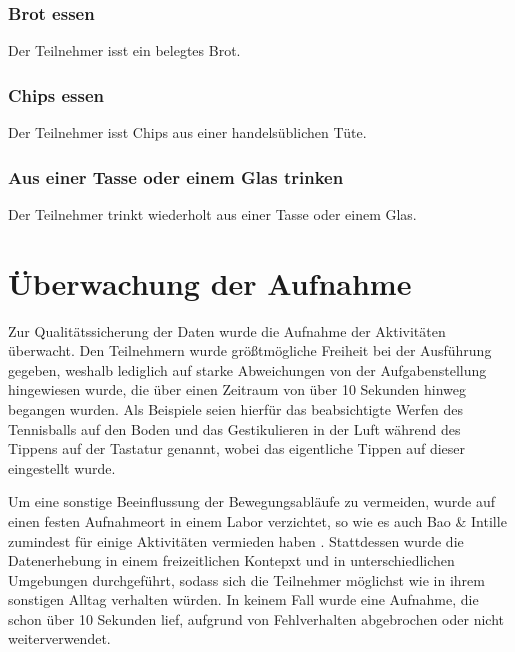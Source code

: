 \subsubsection{Brot essen}
Der Teilnehmer isst ein belegtes Brot.
\subsubsection{Chips essen}
Der Teilnehmer isst Chips aus einer handelsüblichen Tüte.
\subsubsection{Aus einer Tasse oder einem Glas trinken}
Der Teilnehmer trinkt wiederholt aus einer Tasse oder einem Glas.

\newpage

\section{Überwachung der Aufnahme}
Zur Qualitätssicherung der Daten wurde die Aufnahme der Aktivitäten überwacht. Den Teilnehmern wurde größtmögliche Freiheit bei der Ausführung gegeben, weshalb lediglich auf starke Abweichungen von der Aufgabenstellung hingewiesen wurde, die über einen Zeitraum von über 10 Sekunden hinweg begangen wurden. Als Beispiele seien hierfür das beabsichtigte Werfen des Tennisballs auf den Boden und das Gestikulieren in der Luft während des Tippens auf der Tastatur genannt, wobei das eigentliche Tippen auf dieser eingestellt wurde.

Um eine sonstige Beeinflussung der Bewegungsabläufe zu vermeiden, wurde auf einen festen Aufnahmeort in einem Labor verzichtet, so wie es auch Bao \& Intille zumindest für einige Aktivitäten vermieden haben \cite{Bao2004}. Stattdessen wurde die Datenerhebung in einem freizeitlichen Kontepxt und in unterschiedlichen Umgebungen durchgeführt, sodass sich die Teilnehmer möglichst wie in ihrem sonstigen Alltag verhalten würden. In keinem Fall wurde eine Aufnahme, die schon über 10 Sekunden lief, aufgrund von Fehlverhalten abgebrochen oder nicht weiterverwendet.

